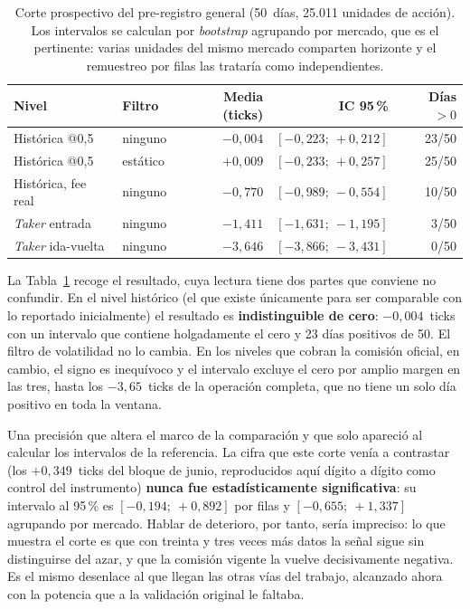 \begin{table}[htbp]
\centering
\caption[Corte prospectivo del pre-registro general]{Corte prospectivo del pre-registro
general (50~días, 25.011 unidades de acción). Los intervalos se calculan por
\emph{bootstrap} agrupando por mercado, que es el pertinente: varias unidades del mismo
mercado comparten horizonte y el remuestreo por filas las trataría como independientes.}
\label{tab::corte_v2}
\begin{tabular}{llrrr}
\toprule
\textbf{Nivel} & \textbf{Filtro} & \textbf{Media (ticks)} & \textbf{IC 95\,\%} & \textbf{Días $>0$} \\
\midrule
Histórica @0,5      & ninguno & $-0{,}004$ & $[-0{,}223;\ +0{,}212]$ & 23/50 \\
Histórica @0,5      & estático & $+0{,}009$ & $[-0{,}233;\ +0{,}257]$ & 25/50 \\
\addlinespace
Histórica, fee real & ninguno & $-0{,}770$ & $[-0{,}989;\ -0{,}554]$ & 10/50 \\
\emph{Taker} entrada& ninguno & $-1{,}411$ & $[-1{,}631;\ -1{,}195]$ & 3/50 \\
\emph{Taker} ida-vuelta & ninguno & $-3{,}646$ & $[-3{,}866;\ -3{,}431]$ & 0/50 \\
\bottomrule
\end{tabular}
\end{table}

La Tabla~\ref{tab::corte_v2} recoge el resultado, cuya lectura tiene dos partes que
conviene no confundir. En el nivel histórico (el que
existe únicamente para ser comparable con lo reportado inicialmente) el resultado es
\textbf{indistinguible de cero}: $-0{,}004$~ticks con un intervalo que contiene
holgadamente el cero y 23 días positivos de 50. El filtro de volatilidad no lo cambia. En
los niveles que cobran la comisión oficial, en cambio, el signo es inequívoco y el intervalo
excluye el cero por amplio margen en las tres, hasta los $-3{,}65$~ticks de la operación
completa, que no tiene un solo día positivo en toda la ventana.

Una precisión que altera el marco de la comparación y que solo apareció al calcular los
intervalos de la referencia. La cifra que este corte venía a contrastar (los
$+0{,}349$~ticks del bloque de junio, reproducidos aquí dígito a dígito como control del
instrumento) \textbf{nunca fue estadísticamente significativa}: su intervalo al 95\,\% es
$[-0{,}194;\ +0{,}892]$ por filas y $[-0{,}655;\ +1{,}337]$ agrupando por mercado. Hablar de deterioro, por tanto, sería impreciso: lo que muestra el corte es que
con treinta y tres veces más datos la señal sigue sin distinguirse del azar, y que la
comisión vigente la vuelve decisivamente negativa. Es el mismo desenlace al que llegan las otras vías del
trabajo, alcanzado ahora con la potencia que a la validación original le faltaba.

